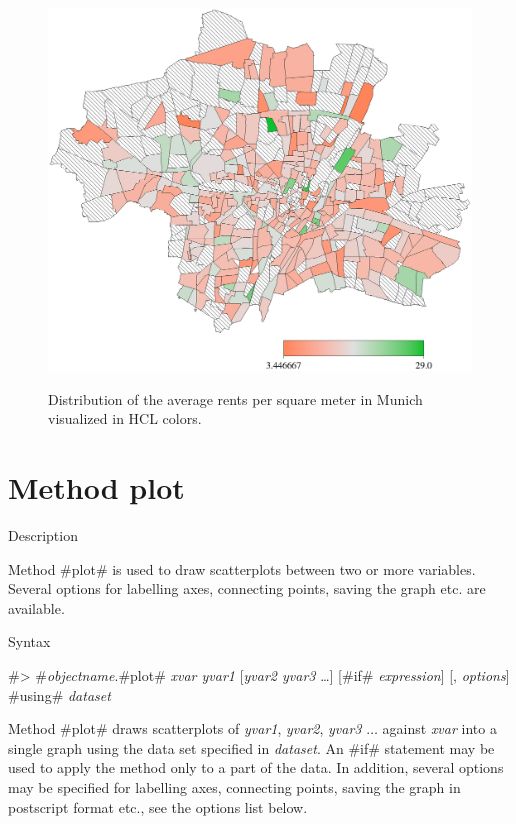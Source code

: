 \begin{figure}[htb]
\begin{center}
\includegraphics[scale=0.5]{grafiken/munichmeansdrawmaphcl.ps}
{\em\caption{ \label{munichmeanshcl} Distribution of the average
rents per square meter in Munich visualized in HCL colors.}}
\end{center}
\end{figure}

\clearpage



\section{Method plot}
\label{graphplot} 
 

\begin{stanza}{Description}

{Method #plot# is used to draw scatterplots between two or more
variables. Several options for labelling axes, connecting points,
saving the graph etc. are available.}
\end{stanza}

\begin{stanza}{Syntax}

{#> #{\em objectname}.#plot#  {\em xvar yvar1} [{\em yvar2 yvar3}
\dots]
[#if# {\em expression}] [, {\em options}] #using# {\em dataset}

Method #plot# draws scatterplots of {\em yvar1}, {\em yvar2}, {\em
yvar3} $\dots$ against {\em xvar} into a single graph using the
data set specified in {\em dataset}. An #if# statement may be used
to apply the method only to a part of the data. In addition,
several options may be specified for labelling axes, connecting
points, saving the graph in postscript format etc., see the
options list below.}
\end{stanza}

